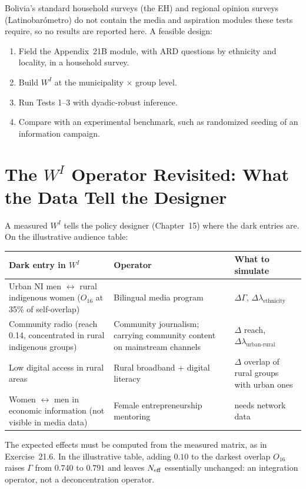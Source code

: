 \documentclass[../structural_economics_book.tex]{subfiles}
\begin{document}
\begin{example}\label{ch21:ex:validation}
Bolivia's standard household surveys (the EH) and regional opinion surveys (Latinobar\'{o}metro) do not contain the media and aspiration modules these tests require, so no results are reported here. A feasible design:
\begin{enumerate}
\item Field the Appendix~21B module, with ARD questions by ethnicity and locality, in a household survey.
\item Build $W^I$ at the municipality $\times$ group level.
\item Run Tests 1--3 with dyadic-robust inference.
\item Compare with an experimental benchmark, such as randomized seeding of an information campaign.
\end{enumerate}
\end{example}


\section{The $W^I$ Operator Revisited: What the Data Tell the Designer}
\label{ch21:sec:operator}

\begin{remark}\label{ch21:prop:data_policy}
A measured $W^I$ tells the policy designer (Chapter~15) where the dark entries are. On the illustrative audience table:

\begin{center}
\begin{tabularx}{\textwidth}{LLL}
\toprule
\textbf{Dark entry in $W^I$} & \textbf{Operator} & \textbf{What to simulate} \\
\midrule
Urban NI men $\leftrightarrow$ rural indigenous women ($O_{16}$ at 35\% of self-overlap) & Bilingual media program & $\Delta\Gamma$, $\Delta\lambda_{\text{ethnicity}}$ \\
Community radio (reach 0.14, concentrated in rural indigenous groups) & Community journalism; carrying community content on mainstream channels & $\Delta$ reach, $\Delta\lambda_{\text{urban-rural}}$ \\
Low digital access in rural areas & Rural broadband + digital literacy & $\Delta$ overlap of rural groups with urban ones \\
Women $\leftrightarrow$ men in economic information (not visible in media data) & Female entrepreneurship mentoring & needs network data \\
\bottomrule
\end{tabularx}
\end{center}

The expected effects must be computed from the measured matrix, as in Exercise~21.6. In the illustrative table, adding $0.10$ to the darkest overlap $O_{16}$ raises $\Gamma$ from $0.740$ to $0.791$ and leaves $N_{\text{eff}}$ essentially unchanged: an integration operator, not a deconcentration operator.
\end{remark}
\end{document}
